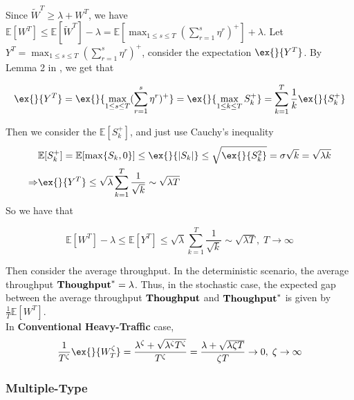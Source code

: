 Since $\tilde{W}^T \geq \lambda+W^T$, we have $\mathbb{E}[W^T]\leq \mathbb{E}[\tilde{W}^T]-\lambda = \mathbb{E}[\max_{1\leq s\leq T}(\sum_{r=1}^{s}\eta^r)^+]+\lambda$. Let $Y^T = \max_{1\leq s\leq T}(\sum_{r=1}^{s}\eta^r)^+$, consider the expectation $\ex{}{Y^T}$.
By Lemma 2 in \cite{strait1974maximum}, we get that
\begin{lemma}\label{lem:Y_T}
    $$\ex{}{Y^T}=\ex{}{\max_{1\leq s\leq T}(\sum_{r=1}^s\eta^r)^+}=\ex{}{\max_{1\leq k\leq T}S_k^+}=\sum_{k=1}^T \frac{1}{k}\ex{}{S_k^+}$$
\end{lemma}
Then we consider the $\mathbb{E}[S_k^+]$, and just use Cauchy's inequality
\begin{align*}
&\mathbb{E}[S_k^+]=\mathbb{E}[\max\{S_k,0\}]\leq \ex{}{|S_k|}\leq \sqrt{\ex{}{S_k^2}}=\sigma\sqrt{k}=\sqrt{\lambda k}\\
\Rightarrow& \ex{}{Y^T}\leq \sqrt{\lambda}\sum_{k=1}^T \frac{1}{\sqrt{k}} \sim \sqrt{\lambda T}
\end{align*}
So we have that 
\begin{lemma}\label{lemma::throughput gap}
    $$\mathbb{E}[W^T]-\lambda\leq \mathbb{E}[Y^T]\leq  \sqrt{\lambda} \sum_{k=1}^T \frac{1}{\sqrt{k}} \sim\sqrt{\lambda T},\; T\to \infty$$
\end{lemma}
Then consider the average throughput. In the deterministic scenario, the average throughput $\textbf{Thoughput}^* = \lambda$. Thus, in the stochastic case, the expected gap between the average throughput $\textbf{Thoughput}$ and $\textbf{Thoughput}^*$ is given by $\frac{1}{T}\mathbb{E}[W^T]$.\\
In \textbf{Conventional Heavy-Traffic} case, 
\begin{align*}
    \frac{1}{T^{\zeta}}\ex{}{W_T^{\zeta}}=\frac{\lambda^{\zeta}+\sqrt{\lambda^{\zeta}T^{\zeta}}}{T^{\zeta}}=\frac{\lambda+\sqrt{\lambda \zeta T }}{\zeta T}\to 0,\; \zeta\to \infty 
\end{align*}

\subsubsection{Multiple-Type}

